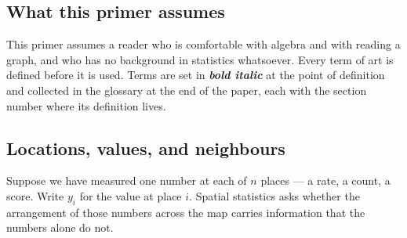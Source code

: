 %
%

\subsection{What this primer assumes}
\label{sec:primer-assumes}

This primer assumes a reader who is comfortable with algebra and with reading a
graph, and who has no background in statistics whatsoever. Every term of art is
defined before it is used. Terms are set in \textbf{\textit{bold italic}} at the
point of definition and collected in the glossary at the end of the paper, each
with the section number where its definition lives.

\subsection{Locations, values, and neighbours}
\label{sec:primer-weights}

Suppose we have measured one number at each of $n$ places --- a rate, a count, a
score. Write $y_i$ for the value at place $i$. Spatial statistics asks whether
the arrangement of those numbers across the map carries information that the
numbers alone do not.

